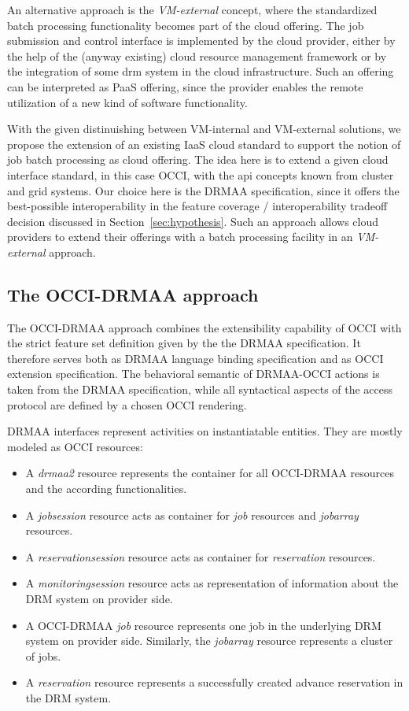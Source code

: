 \documentclass[twocolumn]{svjour3}       %
\begin{document}
An alternative approach is the \emph{VM-external} concept, where the standardized batch processing functionality becomes part of the cloud offering. The job submission and control interface is implemented by the cloud provider, either by the help of the (anyway existing) cloud resource management framework or by the integration of some \gls{drm} system in the cloud infrastructure. Such an offering can be interpreted as PaaS offering, since the provider enables the remote utilization of a new kind of software functionality.

With the given distinuishing between VM-internal and VM-external solutions, we propose the extension of an existing IaaS cloud standard to support the notion of job batch processing as cloud offering. The idea here is to extend a given cloud interface standard, in this case OCCI, with the \gls{api} concepts known from cluster and grid systems. Our choice here is the DRMAA specification, since it offers the best-possible interoperability in the feature coverage / interoperability tradeoff decision discussed in Section~\ref{sec:hypothesis}. Such an approach allows cloud providers to extend their offerings with a batch processing facility in an \emph{VM-external} approach.

\subsection{The OCCI-DRMAA approach}

The OCCI-DRMAA approach combines the extensibility capability of OCCI with the strict feature set definition given by the the DRMAA specification. It therefore serves both as DRMAA language binding specification and as OCCI extension specification. The behavioral semantic of DRMAA-OCCI actions is taken from the DRMAA specification, while all syntactical aspects of the access protocol are defined by a chosen OCCI rendering.

DRMAA interfaces represent activities on instantiatable entities. They are mostly modeled as OCCI resources:

\begin{itemize}
\item A \emph{drmaa2} resource represents the container for all OCCI-DRMAA resources and the according functionalities. 
\item A \emph{jobsession} resource acts as container for \emph{job} resources and \emph{jobarray} resources. 
\item A \emph{reservationsession} resource acts as container for \emph{reservation} resources. 
\item A \emph{monitoringsession} resource acts as representation of information about the DRM system on provider side. 
\item A OCCI-DRMAA \emph{job} resource represents one job in the underlying DRM system on provider side. Similarly, the \emph{jobarray} resource represents a cluster of jobs.
\item A \emph{reservation} resource represents a successfully created advance reservation in the DRM system.
\end{itemize}
\end{document}
